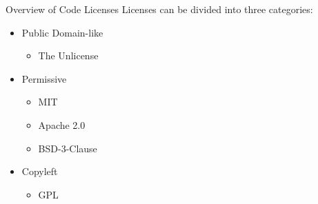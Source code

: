 \documentclass[compress,aspectratio=169]{beamer}
\begin{document}
	\begin{frame}{Overview of Code Licenses}
    Licenses can be divided into three categories:
		\begin{itemize}
      \item Public Domain-like
        \begin{itemize}
          \item The Unlicense
        \end{itemize}
			\item Permissive
        \begin{itemize}
          \item MIT
          \item Apache 2.0
          \item BSD-3-Clause
        \end{itemize}
      \item Copyleft
        \begin{itemize}
          \item GPL
        \end{itemize}
		\end{itemize}
	\end{frame}
\end{document}
